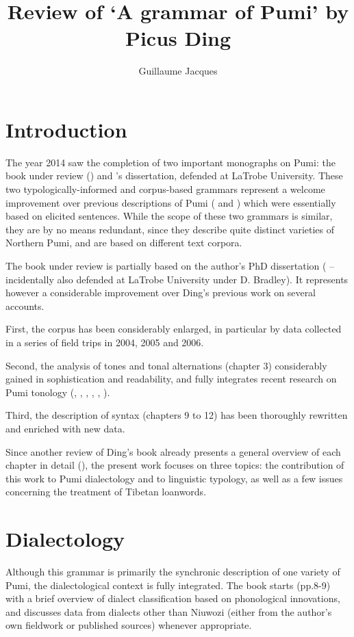\documentclass[oldfontcommands,oneside,a4paper,11pt]{article}
\begin{document}
\title{Review of `A grammar of Pumi' by Picus Ding}
\author{Guillaume Jacques}
\maketitle

\sloppy


\section{Introduction}
The year 2014 saw the completion of two important monographs on Pumi: the book under review (\citealt{ding14grammar}) and \citet{daudey14grammar}'s dissertation, defended at LaTrobe University. These two typologically-informed and corpus-based grammars represent a welcome improvement over previous descriptions of Pumi (\citealt{fual98pumi} and   \citealt{lusz01pumi}) which were essentially based on elicited sentences. While the scope of these two grammars is similar, they are by no means redundant, since they describe quite distinct varieties of Northern Pumi, and are based on different text corpora.

The book under review is partially based on the author's PhD dissertation (\citealt{ding98phd} -- incidentally also defended at LaTrobe University under D. Bradley). It represents however a considerable improvement over Ding's previous work on several accounts. 

First, the corpus has been considerably enlarged, in particular by data collected in a series of field trips in 2004, 2005 and 2006.

Second, the analysis of tones and tonal alternations (chapter 3)  considerably gained in sophistication and readability, and fully integrates recent research on Pumi tonology  (\citealt{matisoff97pumi},  \citealt{ding01pitch},  \citealt{ding03sketch}, \citealt{ding06tonal}, \citealt{ding07perception}, \citealt{jacques11pumi.tone}).

Third, the description of syntax (chapters 9 to 12) has been thoroughly rewritten and enriched with new data.  

Since another review of Ding's book already presents a general overview of each chapter in detail (\citealt{daudey15review}), the present work focuses on three topics: the contribution of this work to Pumi dialectology and to linguistic typology, as well as a few issues concerning the treatment of Tibetan loanwords.


\section{Dialectology}
Although this grammar is primarily the synchronic description of one variety of Pumi,  the dialectological context is fully integrated. The book starts (pp.8-9) with a brief overview of dialect classification based on phonological innovations, and discusses data from dialects other than Niuwozi (either from the author's own fieldwork or published sources) whenever appropriate. 
\end{document}
